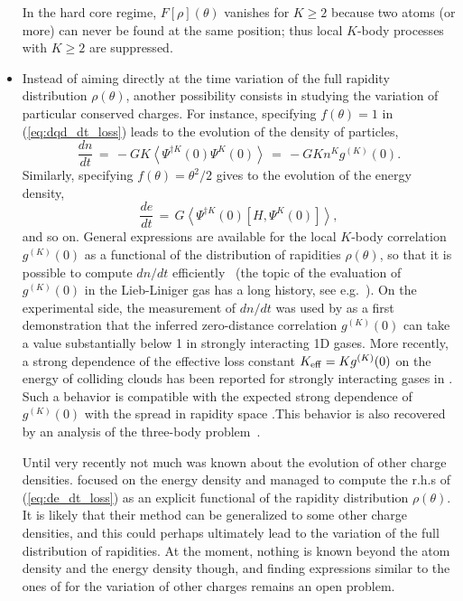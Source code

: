\documentclass[onecolumn,amsfonts,showpacs,superscriptaddress]{revtex4-1}
\begin{document}
\begin{itemize}
    In the hard core regime, $F[\rho](\theta)$ vanishes for $K\geq 2$ because two atoms (or more) can never be found at the same position; thus local $K$-body processes with $K \geq 2$ are suppressed.
    
    \item Instead of aiming directly at the time variation of the full rapidity distribution $\rho(\theta)$, another possibility consists in studying the variation of particular conserved charges. For instance, specifying $f(\theta) = 1$ in (\ref{eq:dqd_dt_loss}) leads to the evolution of the density of particles,
    \begin{equation}
        \frac{dn}{dt} \, = \, -G K \left< \Psi^{\dagger K}(0) \Psi^K(0) \right> \, = \, -G K n^K g^{(K)}(0) .
    \end{equation}
    Similarly, specifying $f(\theta) = \theta^2/2$ gives to the evolution of the energy density,
    \begin{equation}
        \label{eq:de_dt_loss}
        \frac{de}{dt} \, = \, G \left< \Psi^{\dagger K}(0) [H, \Psi^K(0) ] \right> ,
    \end{equation}
    and so on. General expressions are available for the local $K$-body correlation $g^{(K)}(0)$ as a functional of the distribution of rapidities $\rho(\theta)$, so that it is possible to compute $dn/dt$ efficiently~\citep{pozsgay2011mean,bastianello2018exact,bastianello2018sinh} (the topic of the evaluation of $g^{(K)}(0)$ in the Lieb-Liniger gas has a long history, see e.g.~\citep{kheruntsyan2003pair,gangardt2003local,cheianov2006three,cheianov2006exact,kormos2009expectation,kormos2011exact}). 
    On the experimental side, the 
    measurement of $dn/dt$ was used by \cite{tolra_observation_2004} as a first demonstration that the inferred zero-distance correlation $g^{(K)}(0)$ can take a value substantially below 1 in strongly interacting 1D gases. More recently, a strong dependence of the effective loss constant $K_{\rm eff}=Kg^{(K)}(0)$ on the energy 
    of colliding clouds has been reported for strongly interacting gases in \citep{zundel_energy-dependent_2019}. Such a behavior is compatible with the expected strong dependence of $g^{(K)}(0)$ with the spread in rapidity space \citep{gangardt2003stability}.This behavior is also recovered by an analysis of the three-body problem~\citep{mehta_three-body_2007}.
    
    
    Until very recently not much was known about the evolution of other charge densities. \cite{hutsalyuk2020integrability} focused on the energy density and managed to compute the r.h.s of (\ref{eq:de_dt_loss}) as an explicit functional of the rapidity distribution $\rho(\theta)$. It is likely that their method can be generalized to some other charge densities, and this could perhaps ultimately lead to the variation of the full distribution of rapidities. At the moment, nothing is known beyond the atom density and the energy density though, and finding expressions similar to the ones of \citep{pozsgay2011mean,bastianello2018exact,hutsalyuk2020integrability} for the variation of other charges remains an open problem.
\end{itemize}
\end{document}
